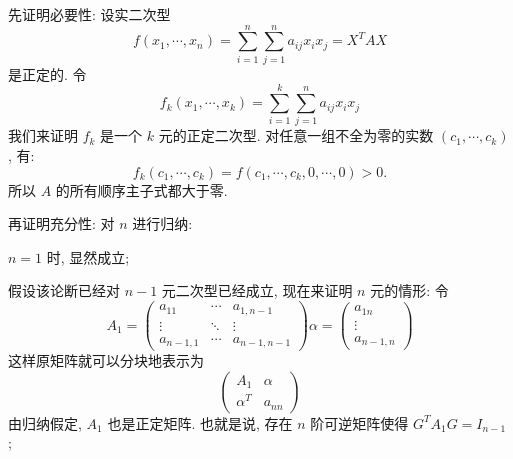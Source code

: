 \documentclass[UTF8]{ctexart}
\DeclareMathOperator{\0}{\mathbf{0}}
\DeclareMathOperator{\<}{\langle}
\renewcommand{\>}{\rangle}
\begin{document}
		\begin{prf}
			先证明必要性: 设实二次型\[ f(x_1,\cdots,x_n)=\sum_{i = 1}^{n} \sum_{j = 1}^{n}a_{ij}x_ix_j =X^TAX  
			\]是正定的. 令\[ f_k(x_1,\cdots,x_k)=\sum_{i = 1}^{k} \sum_{j = 1}^{n}a_{ij}x_ix_j
			\]
			我们来证明 \(f_k\) 是一个 \(k\) 元的正定二次型. 对任意一组不全为零的实数 \((c_1,\cdots,c_k)\), 有: \[ f_k(c_1,\cdots,c_k)=f(c_1,\cdots,c_k,0,\cdots,0)>0.
			\]
			所以 \(A\) 的所有顺序主子式都大于零. 

			再证明充分性: 对 \(n\) 进行归纳: 

			 \(n=1\) 时, 显然成立; 

			假设该论断已经对 \(n-1\) 元二次型已经成立, 现在来证明 \(n\) 元的情形: 令\[ A_1=\begin{pmatrix}
				a_{11}&\cdots&a_{1,n-1}\\\vdots&\ddots&\vdots\\a_{n-1,1}&\cdots&a_{n-1,n-1}
			\end{pmatrix}
			\alpha=\begin{pmatrix}
				a_{1n}\\\vdots\\a_{n-1,n}
			\end{pmatrix}
			\]
			这样原矩阵就可以分块地表示为
			\[ \begin{pmatrix}
				A_1&\alpha\\\alpha^T&a_{nn}
			\end{pmatrix}
			\]
			由归纳假定,  \(A_1\) 也是正定矩阵. 也就是说, 存在 \(n\) 阶可逆矩阵使得 \(G^TA_1G=I_{n-1}\) ; 
			

\end{prf}
\end{document}
